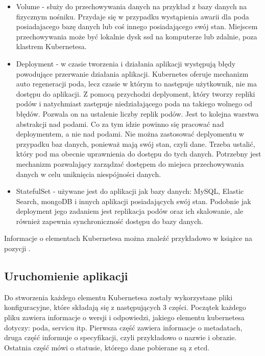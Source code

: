 \documentclass{iiuwb}
\begin{document}
\begin{itemize}
  \item Volume - służy do przechowywania danych na przykład
  z bazy danych na fizycznym nośniku. Przydaje się w przypadku 
  wystąpienia awarii dla poda posiadajacego bazę danych lub coś
  innego posiadającego swój stan. Miejscem przechowywania może 
  być lokalnie dysk ssd na komputerze lub zdalnie, poza
  klastrem Kubernetesa.  

  \item Deployment - w czasie tworzenia i działania aplikacji
  występują błędy powodujące przerwanie działania aplikacji.
  Kubernetes oferuje mechanizm auto regeneracji poda, lecz 
  czasie w którym to następuje użytkownik, nie ma dostępu do 
  aplikacji. Z pomocą przychodzi deplyoment, który tworzy
  repliki podów i natychmiast zastępuje niedziałającego poda
  na takiego wolnego od błędów. Pozwala on na ustalenie liczby
  replik podów. Jest to kolejna warstwa abstrakcji nad podami.
  Co za tym idzie powinno się pracować nad deploymentem, a nie
  nad podami. Nie można zastosować deplyomentu w przypadku 
  baz danych, ponieważ mają swój stan, czyli dane. Trzeba ustalić,
  który pod ma obecnie uprawnienia do dostępu do tych danych.
  Potrzebny jest mechanizm pozwalający zarządzać dostępem do miejsca 
  przechowywania danych w celu uniknięcia niespójności danych.
  
  \item StatefulSet - używane jest do aplikacji jak bazy danych: 
  MySQL, Elastic Search, mongoDB i innych aplikacji posiadających
  swój stan. Podobnie jak deployment jego zadaniem jest 
  replikacja podów oraz ich skalowanie, ale również zapewnia
  synchroniczność dostępu do bazy danych.

\end{itemize}

Informacje o elementach Kubernetesa można znaleźć przykładowo 
w książce na pozycji \cite{Kubernetes}.
  
\subsection{Uruchomienie aplikacji}

Do stworzenia każdego elementu Kubernetesa zostały wykorzystane
pliki konfiguracyjne, które składają się z następujących 3 części.
Początek każdego pliku zawiera informacje o wersji i odpowiedzi,
jakiego elementu kubernetesa dotyczy: poda, servicu itp. Pierwsza
część zawiera informacje o metadatach, druga część informuje
o specyfikacji, czyli przykładowo o nazwie i obrazie. Ostatnia
część mówi o statusie, którego dane pobierane są z etcd.
\end{document}
